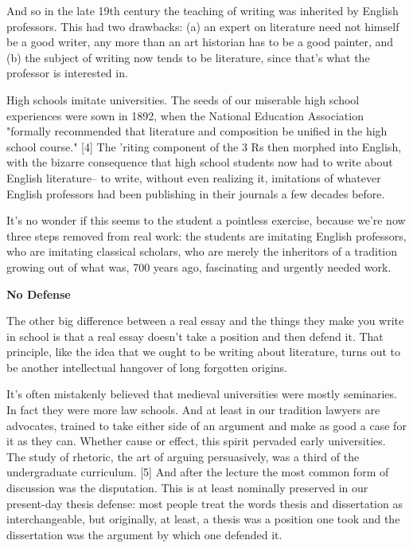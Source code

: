 And so in the late 19th century the
                  teaching of writing was inherited by English professors. This
                  had two drawbacks: (a) an expert on literature need not
                  himself be a good writer, any more than an art historian has
                  to be a good painter, and (b) the subject of writing now tends
                  to be literature, since that's what the professor is
                  interested in.

High schools imitate universities.
                  The seeds of our miserable high school experiences were sown
                  in 1892, when the National Education Association "formally
                  recommended that literature and composition be unified in the
                  high school course." [4] The 'riting component of the 3 Rs
                  then morphed into English, with the bizarre consequence that
                  high school students now had to write about English
                  literature-- to write, without even realizing it, imitations
                  of whatever English professors had been publishing in their
                  journals a few decades before.

It's no wonder if
                  this seems to the student a pointless exercise, because we're
                  now three steps removed from real work: the students are
                  imitating English professors, who are imitating classical
                  scholars, who are merely the inheritors of a tradition growing
                  out of what was, 700 years ago, fascinating and urgently
                  needed work.

\textbf{No Defense}

The other
                  big difference between a real essay and the things they make
                  you write in school is that a real essay doesn't take a
                  position and then defend it. That principle, like the idea
                  that we ought to be writing about literature, turns out to be
                  another intellectual hangover of long forgotten origins.

It's
                  often mistakenly believed that medieval universities were
                  mostly seminaries. In fact they were more law schools. And at
                  least in our tradition lawyers are advocates, trained to take
                  either side of an argument and make as good a case for it as
                  they can. Whether cause or effect, this spirit pervaded early
                  universities. The study of rhetoric, the art of arguing
                  persuasively, was a third of the undergraduate curriculum. [5]
                  And after the lecture the most common form of discussion was
                  the disputation. This is at least nominally preserved in our
                  present-day thesis defense: most people treat the words thesis
                  and dissertation as interchangeable, but originally, at least,
                  a thesis was a position one took and the dissertation was the
                  argument by which one defended it.

